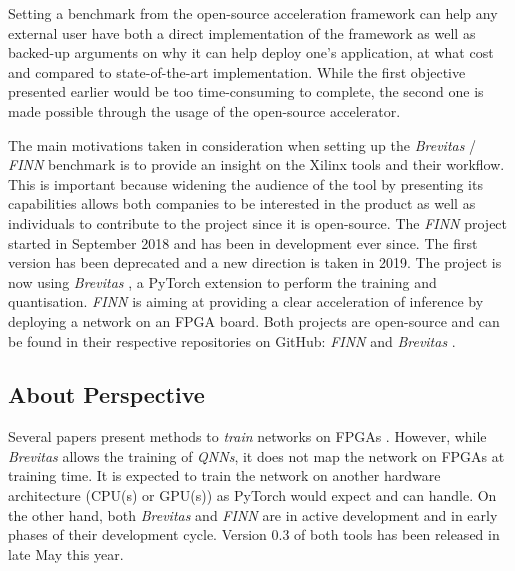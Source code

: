 Setting a benchmark from the open-source acceleration framework can help any external user have both a direct implementation of the framework as well as backed-up arguments on why it can help deploy one's application, at what cost and compared to state-of-the-art implementation. While the first objective presented earlier would be too time-consuming to complete, the second one is made possible through the usage of the open-source accelerator.

The main motivations taken in consideration when setting up the \emph{Brevitas} / \emph{FINN} benchmark is to provide an insight on the Xilinx tools and their workflow. This is important because widening the audience of the tool by presenting its capabilities allows both companies to be interested in the product as well as individuals to contribute to the project since it is open-source. The \emph{FINN} project started in September 2018 and has been in development ever since. The first version has been deprecated and a new direction is taken in 2019. The project is now using \emph{Brevitas} \cite{Pappalardo2020}, a PyTorch extension to perform the training and quantisation. \emph{FINN} is aiming at providing a clear acceleration of inference by deploying a network on an FPGA board. Both projects are open-source and can be found in their respective repositories on GitHub: \emph{FINN} \cite{FINNRepo} and \emph{Brevitas} \cite{BrevitasRepo}.


\subsection{About Perspective}

Several papers present methods to \emph{train} networks on FPGAs \cite{Colangelo2018, Zhao2016, Jahanshahi2019}. However, while \emph{Brevitas} allows the training of \emph{QNNs}, it does not map the network on FPGAs at training time. It is expected to train the network on another hardware architecture (CPU(s) or GPU(s)) as PyTorch would expect and can handle. On the other hand, both \emph{Brevitas} and \emph{FINN} are in active development and in early phases of their development cycle. Version 0.3 of both tools has been released in late May this year.


